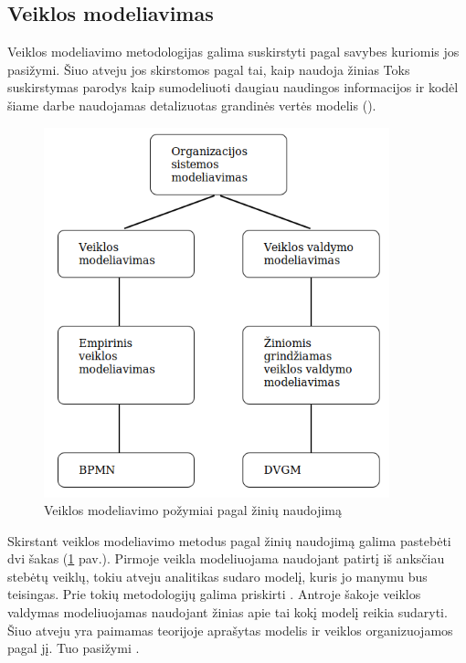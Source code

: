 \subsection{Veiklos modeliavimas}

Veiklos modeliavimo metodologijas galima suskirstyti pagal savybes kuriomis jos
pasižymi. Šiuo atveju jos skirstomos pagal tai, kaip naudoja žinias
Toks suskirstymas parodys kaip sumodeliuoti daugiau
naudingos informacijos ir kodėl šiame darbe naudojamas detalizuotas grandinės
vertės modelis (\DVCM{}).

\begin{figure}[H]
	\centering
	\includegraphics[width=10cm]{./sections/modeling_methods_and_languages/img/business_system_modeling}
	\caption{Veiklos modeliavimo požymiai pagal žinių naudojimą}
	\label{img:business_system_modeling}
\end{figure}

Skirstant veiklos modeliavimo metodus pagal žinių naudojimą galima pastebėti dvi
šakas (\ref{img:business_system_modeling} pav.). Pirmoje veikla
modeliuojama naudojant patirtį iš anksčiau stebėtų veiklų, tokiu atveju
analitikas sudaro modelį, kuris jo manymu bus teisingas. Prie tokių metodologijų
galima priskirti \BPMN{} . Antroje šakoje veiklos valdymas modeliuojamas
naudojant žinias apie tai kokį modelį reikia sudaryti. Šiuo atveju yra paimamas
teorijoje aprašytas modelis ir veiklos organizuojamos pagal jį. Tuo pasižymi
\DVCM{}.




